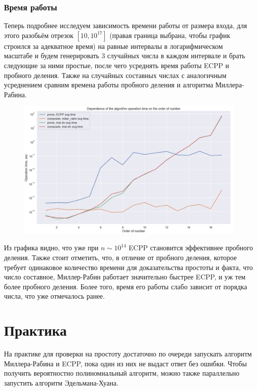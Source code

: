 \documentclass[12pt]{article}
\theoremstyle{definition}
\numberwithin{Def}{section}
\numberwithin{Th}{section}
\numberwithin{St}{section}
\numberwithin{Cor}{section}
\begin{document}
\subsubsection{Время работы}

Теперь подробнее исследуем зависимость времени работы от размера входа, для
этого разобьём отрезок $[10, 10^{17}]$ (правая граница выбрана, чтобы график
строился за адекватное время) на равные интервалы в логарифмическом
масштабе и будем генерировать 3 случайных числа в каждом интервале и брать
следующие за ними простые, после чего усреднять время работы ECPP и пробного
деления. Также на случайных составных числах с аналогичным усреднением сравним
времена работы пробного деления и алгоритма Миллера-Рабина.

\begin{figure}[H]
 	\includegraphics[width=\linewidth]{timings.png}
\end{figure}
Из графика видно, что уже при $n\sim 10^{14}$ ECPP становится эффективнее
пробного деления. Также стоит отметить, что, в отличие от пробного деления,
которое требует одинаковое количество времени для доказательства простоты
и факта, что число составное, Миллер-Рабин работает значительно быстрее ECPP,
и уж тем более пробного деления. Более того, время его работы слабо зависит
от порядка числа, что уже отмечалось ранее.

\section{Практика}

На практике для проверки на простоту достаточно по очереди запускать
алгоритм Миллера-Рабина и ECPP, пока один из них не выдаст ответ без ошибки.
Чтобы получить вероятностно полиномиальный алгоритм, можно также параллельно
запустить алгоритм Эдельмана-Хуана.
\end{document}
